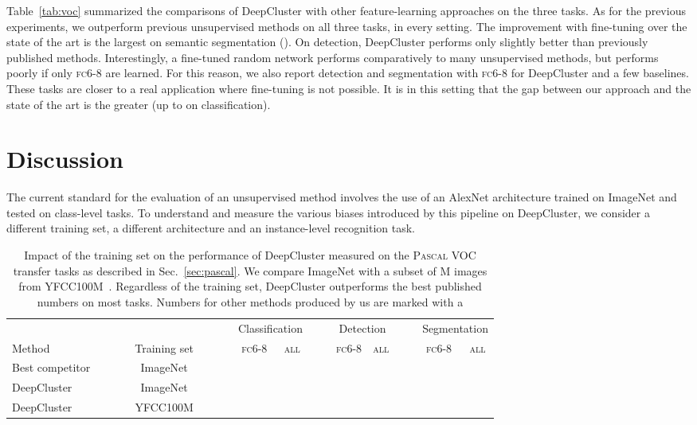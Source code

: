 \documentclass[runningheads]{llncs}
\newlength{\soustable}
\def\OURS{DeepCluster\xspace}
\begin{document}
Table~\ref{tab:voc} summarized the comparisons of \OURS with other feature-learning approaches on the three tasks.
As for the previous experiments, we outperform previous unsupervised methods on all three tasks, in every setting.
The improvement with fine-tuning over the state of the art is the largest on semantic segmentation ().
On detection, \OURS performs only slightly better than previously published methods.
Interestingly, a fine-tuned random network performs comparatively to many unsupervised methods, but performs poorly if only \textsc{fc6-8} are learned.
For this reason, we also report detection and segmentation with \textsc{fc6-8} for \OURS and a few baselines.
These tasks are closer to a real application where fine-tuning is not possible.
It is in this setting that the gap between our approach and the state of the art is the greater (up to  on classification).

 




\section{Discussion}

The current standard for the evaluation of an unsupervised method involves the use of an AlexNet architecture trained on ImageNet and tested on class-level tasks.
To understand and measure the various biases introduced by this pipeline on \OURS, we consider a different training set, a different architecture and an instance-level recognition task.

\begin{table}[t!]
  \centering
  \begin{tabular}{@{}lc cc cc c cc c cc@{}}
    \toprule
                      &~~~~&            &~~~~& \multicolumn{2}{c}{Classification} &~~& \multicolumn{2}{c}{Detection} &~~& \multicolumn{2}{c}{Segmentation} \\
                      \cmidrule{5-6} \cmidrule{8-9} \cmidrule{11-12}
    Method    && Training set && \textsc{fc6-8}& \textsc{all}   && \textsc{fc6-8}& \textsc{all}  && \textsc{fc6-8}& \textsc{all} \\
                      \midrule
    Best competitor &&ImageNet&&   &  &&  &  &&  &  \\
                      \midrule
    \OURS&& ImageNet   &&   &   &&  &  &&  &  \\
    \OURS&& YFCC100M   &&   &   &&  &  &&  &  \\
    \bottomrule
  \end{tabular}
  \vspace{\soustable}
  \caption{
    Impact of the training set on the performance of \OURS measured on the \textsc{Pascal} VOC transfer tasks as described in Sec.~\ref{sec:pascal}.
    We compare ImageNet with a subset of M images from YFCC100M~\cite{thomee2015new}.
    Regardless of the training set, \OURS outperforms the best published numbers on most tasks.
  Numbers for other  methods produced by us are marked with a 
  }
  \label{tab:flickr}
\end{table}
\end{document}
